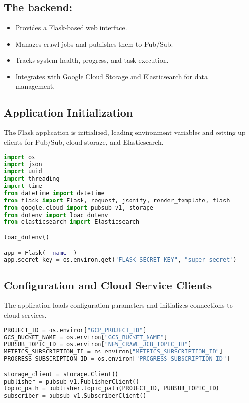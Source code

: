 \documentclass[12pt,a4paper]{report}
\begin{document}
\subsection{The backend:}
\begin{itemize}
\item Provides a Flask-based web interface.
\item Manages crawl jobs and publishes them to Pub/Sub.
\item Tracks system health, progress, and task execution.
\item Integrates with Google Cloud Storage and Elasticsearch for data management.
\end{itemize}
\subsection{Application Initialization}
The Flask application is initialized, loading environment variables and setting up clients for Pub/Sub, cloud storage, and Elasticsearch.
\begin{lstlisting}[language=Python]
import os
import json
import uuid
import threading
import time
from datetime import datetime
from flask import Flask, request, jsonify, render_template, flash
from google.cloud import pubsub_v1, storage
from dotenv import load_dotenv
from elasticsearch import Elasticsearch

load_dotenv()

app = Flask(__name__)
app.secret_key = os.environ.get("FLASK_SECRET_KEY", "super-secret")
\end{lstlisting}

\subsection{Configuration and Cloud Service Clients}
The application loads configuration parameters and initializes connections to cloud services.
\begin{lstlisting}[language=Python]
PROJECT_ID = os.environ["GCP_PROJECT_ID"]
GCS_BUCKET_NAME = os.environ["GCS_BUCKET_NAME"]
PUBSUB_TOPIC_ID = os.environ["NEW_CRAWL_JOB_TOPIC_ID"]
METRICS_SUBSCRIPTION_ID = os.environ["METRICS_SUBSCRIPTION_ID"]
PROGRESS_SUBSCRIPTION_ID = os.environ["PROGRESS_SUBSCRIPTION_ID"]

storage_client = storage.Client()
publisher = pubsub_v1.PublisherClient()
topic_path = publisher.topic_path(PROJECT_ID, PUBSUB_TOPIC_ID)
subscriber = pubsub_v1.SubscriberClient()
\end{lstlisting}
\newpage
\end{document}
